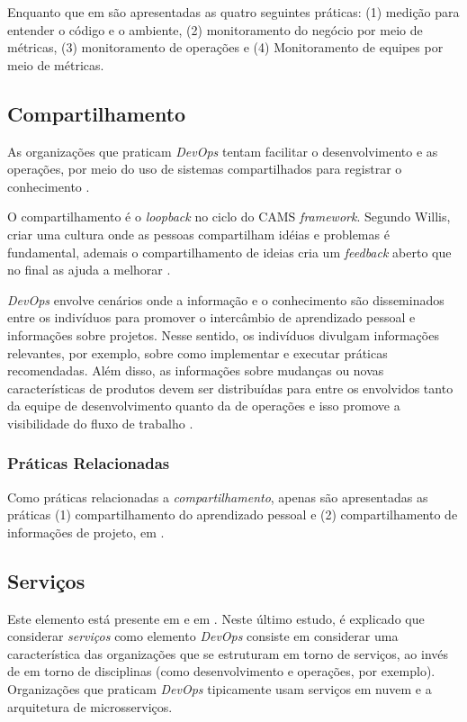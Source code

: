 Enquanto que em \cite{characterizing_devops} são apresentadas as quatro
seguintes práticas: (1) medição para entender o código e o ambiente, (2)
monitoramento do negócio por meio de métricas, (3) monitoramento de operações
e (4) Monitoramento de equipes por meio de métricas.

\subsection{Compartilhamento}

As organizações que praticam \textit{DevOps} tentam facilitar o desenvolvimento
e as operações, por meio do uso de sistemas compartilhados para registrar o
conhecimento \cite{qualitative_devops_journalsw_17}.

O compartilhamento é o \textit{loopback} no ciclo do \acrshort{CAMS}
\textit{framework}. Segundo Willis, criar uma cultura onde as pessoas
compartilham idéias e problemas é fundamental, ademais o compartilhamento de
ideias cria um \textit{feedback} aberto que no final as ajuda a melhorar
\cite{what_devops_means_2010}.

\textit{DevOps} envolve cenários onde a informação e o conhecimento são
disseminados entre os indivíduos para promover o intercâmbio de aprendizado
pessoal e informações sobre projetos. Nesse sentido, os indivíduos divulgam
informações relevantes, por exemplo, sobre como implementar e executar
práticas recomendadas. Além disso, as informações sobre mudanças ou novas
características de produtos devem ser distribuídas para entre os envolvidos
tanto da equipe de desenvolvimento quanto da de operações e isso promove a
visibilidade do fluxo de trabalho \cite{characterizing_devops}.

\subsubsection{Práticas Relacionadas}

Como práticas relacionadas a \emph{compartilhamento}, apenas são apresentadas
as práticas (1) compartilhamento do aprendizado pessoal e (2) compartilhamento
de informações de projeto, em \cite{characterizing_devops}.

\subsection{Serviços}

Este elemento está presente em \cite{cooperation_dev_ops_esem_2014} e em
\cite{qualitative_devops_journalsw_17}. Neste último estudo, é explicado que
considerar \emph{serviços} como elemento \textit{DevOps} consiste em considerar
uma característica das organizações que se estruturam em torno de serviços,
ao invés de em torno de disciplinas (como desenvolvimento e operações, por
exemplo). Organizações que praticam \textit{DevOps}
tipicamente usam serviços em nuvem e a arquitetura de microsserviços.

